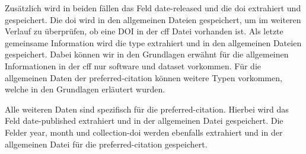 Zusätzlich wird in beiden fällen das Feld \glqq date-released\grqq{} und die \glqq doi\grqq{} extrahiert und gespeichert.
Die \glqq doi\grqq{} wird in den allgemeinen Dateien gespeichert, um im weiteren Verlauf zu überprüfen, ob eine DOI in der \gls{cff} Datei vorhanden ist.
Als letzte gemeinsame Information wird die \glqq type\grqq{} extrahiert und in den allgemeinen Dateien gespeichert.
Dabei können wir in den Grundlagen erwähnt für die allgemeinen Informationen in der \gls{cff} nur \glqq software\grqq{} und \glqq dataset\grqq{} vorkommen.
Für die allgemeinen Daten der \glqq preferred-citation\grqq{} können weitere Typen vorkommen, welche in den Grundlagen erläutert wurden.

Alle weiteren Daten sind spezifisch für die \glqq preferred-citation\grqq{}.
Hierbei wird das Feld \glqq date-published\grqq{} extrahiert und in der allgemeinen Datei  gespeichert.
Die Felder \glqq year\grqq{}, \glqq month\grqq{} und \glqq collection-doi\grqq{} werden ebenfalls extrahiert und in der allgemeinen Datei für die \glqq preferred-citation\grqq{} gespeichert.
